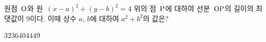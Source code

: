 원점~$\mathrm{O}$와 원~$(x-a)^2+(y-b)^2=4$ 위의 점~$\mathrm{P}$에 대하여 선분~$\mathrm{OP}$의 길이의 최댓값이 $9$이다. 이때 상수 $a$, $b$에 대하여 $a^2+b^2$의 값은?
\begin{choices32}{$32$}{$36$}{$40$}{$44$}{$49$}\end{choices32}
